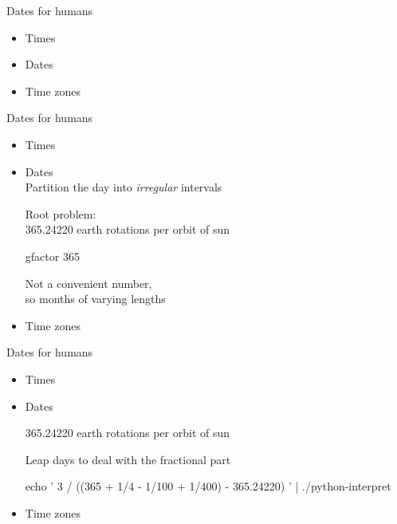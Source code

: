 \documentclass[xcolor=svgnames,17pt]{beamer}
\newcommand*{\sizefont}[1]{%
    \ifcase#1\relax
    \or \tiny
    \or \scriptsize
    \or \footnotesize
    \or \small
    \or \normalsize
    \or \large
    \or \Large
    \or \LARGE
    \or \huge
    \or \Huge
    \fi}
\begin{document}
\begin{frame}[fragile]{Dates for humans}
\begin{itemize}
\item Times
\item \alert{Dates}




\item Time zones
\end{itemize}
\end{frame}

\begin{frame}[fragile]{Dates for humans}
\begin{itemize}
\item Times
\item \alert{Dates} \\
    Partition the day into \textit{irregular} intervals

    Root problem: \\
    365.24220 earth rotations per orbit of sun

\bash[stdout,script,prefix=$\space]
gfactor 365
\END

Not a convenient number, \\
so months of varying lengths

\item Time zones
\end{itemize}
\end{frame}

\begin{frame}[fragile]{Dates for humans}
\begin{itemize}
\item Times
\item \alert{Dates}

    365.24220 earth rotations per orbit of sun

    Leap days to deal with the fractional part

{
\sizefont{2}
\bash[stdout]
echo '
3 / ((365 + 1/4 - 1/100 + 1/400) - 365.24220)
' | ./python-interpret
\END
}

\item Time zones
\end{itemize}
\end{frame}
\end{document}
